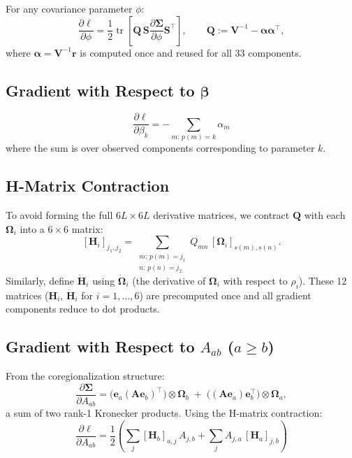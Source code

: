 \documentclass[11pt]{article}
\newcommand{\bbeta}{\bm{\beta}}
\newcommand{\bA}{\mathbf{A}}
\newcommand{\bV}{\mathbf{V}}
\newcommand{\bS}{\mathbf{S}}
\newcommand{\bSigma}{\bm{\Sigma}}
\newcommand{\bOmega}{\bm{\Omega}}
\newcommand{\be}{\mathbf{e}}
\newcommand{\br}{\mathbf{r}}
\newcommand{\tr}{\operatorname{tr}}
\begin{document}
For any covariance parameter $\phi$:
\begin{equation}\label{eq:grad_general}
\frac{\partial \ell}{\partial \phi} = \frac{1}{2}\tr\!\left[\mathbf{Q}\, \bS\frac{\partial \bSigma}{\partial \phi}\bS^\top\right], \qquad \mathbf{Q} := \bV^{-1} - \bm{\alpha}\bm{\alpha}^\top,
\end{equation}
where $\bm{\alpha} = \bV^{-1}\br$ is computed once and reused for all 33 components.

\subsection{Gradient with Respect to $\bbeta$}

\begin{equation}\label{eq:grad_beta}
\boxed{\frac{\partial \ell}{\partial \beta_k} = -\sum_{m:\, p(m) = k} \alpha_m}
\end{equation}
where the sum is over observed components corresponding to parameter $k$.

\subsection{H-Matrix Contraction}

To avoid forming the full $6L \times 6L$ derivative matrices, we contract $\mathbf{Q}$ with each $\bOmega_i$ into a $6 \times 6$ matrix:
\begin{equation}\label{eq:H}
[\mathbf{H}_i]_{j_1, j_2} = \sum_{\substack{m:\, p(m) = j_1 \\ n:\, p(n) = j_2}} Q_{mn}\, [\bOmega_i]_{s(m), s(n)}.
\end{equation}
Similarly, define $\dot{\mathbf{H}}_i$ using $\dot{\bOmega}_i$ (the derivative of $\bOmega_i$ with respect to $\rho_i$). These 12 matrices ($\mathbf{H}_i$, $\dot{\mathbf{H}}_i$ for $i = 1, \ldots, 6$) are precomputed once and all gradient components reduce to dot products.

\subsection{Gradient with Respect to $A_{ab}$ ($a \geq b$)}

From the coregionalization structure:
\begin{equation}\label{eq:dsigma_dA}
\frac{\partial \bSigma}{\partial A_{ab}} = \bigl(\be_a (\bA\be_b)^\top\bigr) \otimes \bOmega_b \;+\; \bigl((\bA\be_a)\be_b^\top\bigr) \otimes \bOmega_a,
\end{equation}
a sum of two rank-1 Kronecker products. Using the H-matrix contraction:
\begin{equation}\label{eq:grad_A}
\boxed{\frac{\partial \ell}{\partial A_{ab}} = \frac{1}{2}\left(\sum_{j} [\mathbf{H}_b]_{a,j}\, A_{j,b} + \sum_{j} A_{j,a}\, [\mathbf{H}_a]_{j,b}\right)}
\end{equation}
\end{document}
